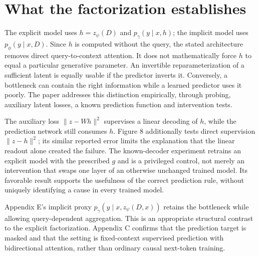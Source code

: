 \documentclass[10pt]{article}
\begin{document}
\section*{What the factorization establishes}
The explicit model uses \(h=z_\psi(D)\) and \(p_\gamma(y\mid x,h)\); the implicit model uses \(p_\phi(y\mid x,D)\). Since \(h\) is computed without the query, the stated architecture removes direct query-to-context attention. It does not mathematically force \(h\) to equal a particular generative parameter. An invertible reparameterization of a sufficient latent is equally usable if the predictor inverts it. Conversely, a bottleneck can contain the right information while a learned predictor uses it poorly. The paper addresses this distinction empirically, through probing, auxiliary latent losses, a known prediction function and intervention tests.\par
The auxiliary loss \(\|z-Wh\|^2\) supervises a linear decoding of \(h\), while the prediction network still consumes \(h\). Figure 8 additionally tests direct supervision \(\|z-h\|^2\); its similar reported error limits the explanation that the linear readout alone created the failure. The known-decoder experiment retrains an explicit model with the prescribed \(g\) and is a privileged control, not merely an intervention that swaps one layer of an otherwise unchanged trained model. Its favorable result supports the usefulness of the correct prediction rule, without uniquely identifying a cause in every trained model.\par
Appendix E’s implicit proxy \(p_\gamma(y\mid x,z_\psi(D,x))\) retains the bottleneck while allowing query-dependent aggregation. This is an appropriate structural contrast to the explicit factorization. Appendix C confirms that the prediction target is masked and that the setting is fixed-context supervised prediction with bidirectional attention, rather than ordinary causal next-token training.\par
\end{document}
